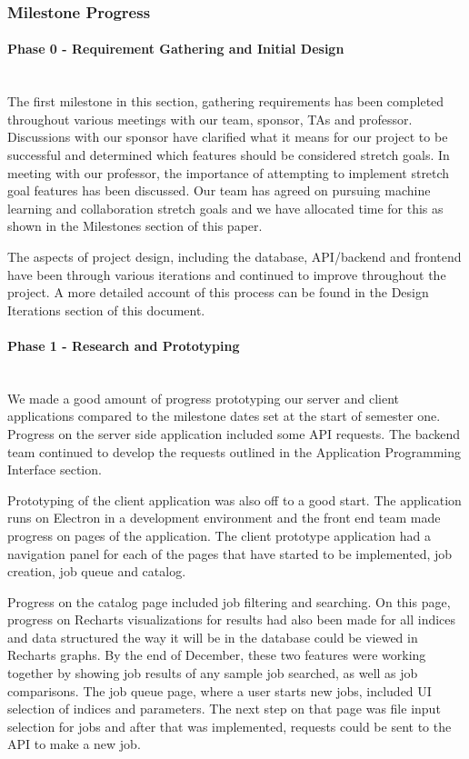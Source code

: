 \subsubsection{Milestone Progress}
\paragraph{Phase 0 - Requirement Gathering and Initial Design} \mbox{}\\[\paragraphheaderspace]
The first milestone in this section, gathering requirements has been completed throughout various meetings with our team, sponsor, TAs and professor. Discussions with our sponsor have clarified what it means for our project to be successful and determined which features should be considered stretch goals. In meeting with our professor, the importance of attempting to implement stretch goal features has been discussed. Our team has agreed on pursuing machine learning  and collaboration stretch goals and we have allocated time for this as shown in the Milestones section of this paper.\par
The aspects of project design, including the database, API/backend and frontend have been through various iterations and continued to improve throughout the project. A more detailed account of this process can be found in the Design Iterations section of this document.\par
\paragraph{Phase 1 - Research and Prototyping} \mbox{}\\[\paragraphheaderspace]
We made a good amount of progress prototyping our server and client applications compared to the milestone dates set at the start of semester one. Progress on the server side application included some API requests. The backend team continued to develop the requests outlined in the Application Programming Interface section.\par
Prototyping of the client application was also off to a good start. The application runs on Electron in a development environment and the front end team made progress on pages of the application. The client prototype application had a navigation panel for each of the pages that have started to be implemented, job creation, job queue and catalog.\par
Progress on the catalog page included job filtering and searching. On this page, progress on Recharts visualizations for results had also been made for all indices and data structured the way it will be in the database could be viewed in Recharts graphs. By the end of December, these two features were working together by showing job results of any sample job searched, as well as job comparisons. The job queue page, where a user starts new jobs, included UI selection of indices and parameters. The next step on that page was file input selection for jobs and after that was implemented, requests could be sent to the API to make a new job.\par
\newpage
